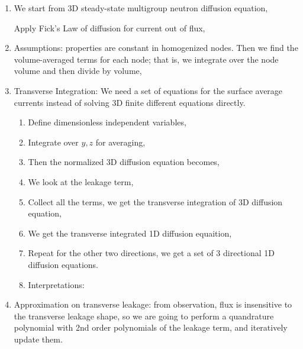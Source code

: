\documentclass{school-22.211-notes}
\begin{document}
\clearpage
{}
\begin{enumerate}
\item We start from 3D steady-state multigroup neutron diffusion equation, 

Apply Fick's Law of diffusion for current out of flux, 

\item Assumptions: properties are constant in homogenized nodes. Then we find the volume-averaged terms for each node; that is, we integrate over the node volume and then divide by volume,

\item Transverse Integration: We need a set of equations for the surface average currents instead of solving 3D finite different equations directly. 
  \begin{enumerate}
  \item Define dimensionless independent variables,

  \item Integrate over $y,z$ for averaging,

  \item Then the normalized 3D diffusion equation becomes, 

  \item We look at the leakage term, 


  \item Collect all the terms, we get the transverse integration of 3D diffusion equation, 

  \item We get the transverse integrated 1D diffusion equaition,

  \item Repeat for the other two directions, we get a set of 3 directional 1D diffusion equations.

  \item Interpretations: 

  \end{enumerate}

\item Approximation on transverse leakage: from observation, flux is insensitive to the transverse leakage shape, so we are going to perform a quandrature polynomial with 2nd order polynomials of the leakage term, and iteratively update them. 

\end{enumerate}
\end{document}
